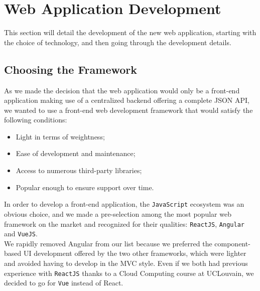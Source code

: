 \documentclass{eplmastersthesis}
\begin{document}
    \section{Web Application Development}

      This section will detail the development of the new web application,
      starting with the choice of technology, and then going through the
      development details.

      \subsection{Choosing the Framework}

        As we made the decision that the web application would only be a
        front-end application making use of a centralized backend offering
        a complete JSON API, we wanted to use a front-end web development
        framework that would satisfy the following conditions: \\

        \begin{itemize}
          \item Light in terms of weightness;
          \item Ease of development and maintenance;
          \item Access to numerous third-party libraries;
          \item Popular enough to ensure support over time.
        \end{itemize}

        In order to develop a front-end application, the \texttt{JavaScript} ecosystem
        was an obvious choice, and we made a pre-selection among the most
        popular web framework on the market and recognized for their qualities:
        \texttt{ReactJS}, \texttt{Angular} and \texttt{VueJS}.\\
        We rapidly removed Angular from our list because we preferred the
        component-based UI development offered by the two other frameworks,
        which were lighter and avoided having to develop in the MVC style.
        Even if we both had previous experience with \texttt{ReactJS} thanks to a
        Cloud Computing course at UCLouvain, we decided to go for \texttt{Vue}
        instead of React.\\
\end{document}
